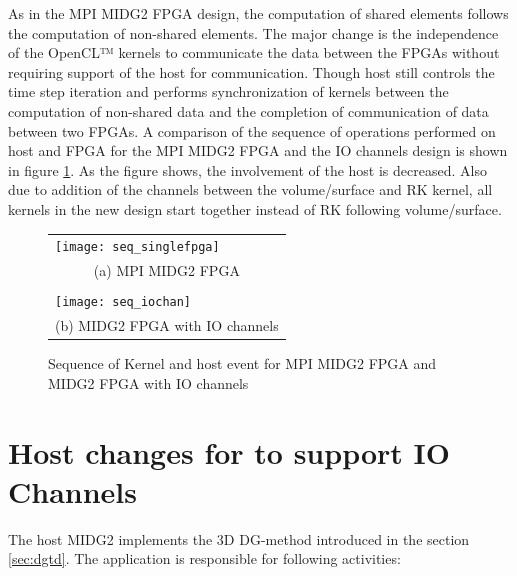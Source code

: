 As in the MPI MIDG2 FPGA design, the computation of shared elements follows the computation of
non-shared elements. The major change is the independence of the OpenCL™ kernels to
communicate the data between the FPGAs without requiring support of the host for
communication. Though host still controls the time step iteration and performs synchronization of kernels between
the computation of non-shared data and the completion of communication of data between two FPGAs.
A comparison of the sequence of operations performed on host and FPGA for the MPI MIDG2 FPGA and
the IO channels design is shown in figure \ref{fig:sequence_comp}. As the figure shows,
the involvement of the host is decreased. Also due to addition of the channels between
the volume/surface and RK kernel, all kernels in the new design start together instead
of RK following volume/surface.

\begin{figure}[h]
	\centering\small
	\begin{tabular}{l@{\hskip 0.5in}}
        \texttt{[image: seq\_singlefpga]} \\
        \multicolumn{1}{c}{(a) MPI MIDG2 FPGA}  \\
        \\
        \texttt{[image: seq\_iochan]} \\
        \multicolumn{1}{c}{(b) MIDG2 FPGA with IO channels}
	\end{tabular}
    \caption{Sequence of Kernel and host event for MPI MIDG2 FPGA
    and MIDG2 FPGA with IO channels}
	\label{fig:sequence_comp}
\end{figure}

\section{Host changes for to support IO Channels}

The host MIDG2 implements the 3D DG-method introduced in the section \ref{sec:dgtd}.
The application is responsible for following activities:

